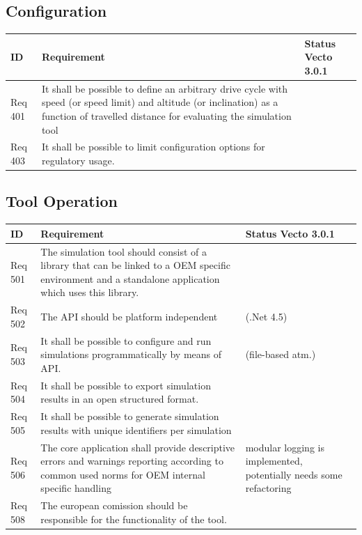 \subsection{Configuration} %
\label{sub:configuration}

\begin{tabular}{L{\IdColWidth}|L{\ReqColWidth}|M{\StatusColWidth}}
ID & Requirement & Status Vecto 3.0.1 \\ \hline\hline
Req 401 & It shall be possible to define an arbitrary drive cycle with speed (or speed limit) and altitude (or inclination) as a function of travelled distance for evaluating the simulation tool & 
	\Vcheck	 \\ \hline
Req 403 & It shall be possible to limit configuration options for regulatory usage. & 
	\Vcheck	 \\ \hline
\end{tabular}

\subsection{Tool Operation} %
\label{sub:tool_operation}

\begin{tabular}{L{\IdColWidth}|L{\ReqColWidth}|M{\StatusColWidth}}
ID & Requirement & Status Vecto 3.0.1 \\ \hline\hline
Req 501 & The simulation tool should consist of a library that can be linked to a OEM specific environment and a standalone application which uses this library. & 
	\Vcheck	 \\ \hline
Req 502 & The API should be platform independent & 
	\Vcheck \newline (.Net 4.5)	 \\ \hline
Req 503 & It shall be possible to configure and run simulations programmatically by means of API. & 
	\Vcheck \newline (file-based atm.)	 \\ \hline
Req 504 & It shall be possible to export simulation results in an open structured format. & 
	\Vcheck	 \\ \hline
Req 505 & It shall be possible to generate simulation results with unique identifiers per simulation & 
	\Vtodo	 \\ \hline
Req 506 & The core application shall provide descriptive errors and warnings reporting according to common used norms for OEM internal specific handling & 
	modular logging is implemented, potentially needs some refactoring	 \\ \hline
Req 508 & The european comission should be responsible for the functionality of the tool. & 
		 \\ \hline
\end{tabular}

